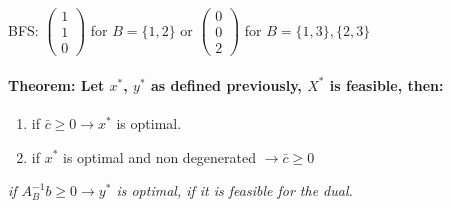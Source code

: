 \documentclass[main]{subfiles}
\begin{document}
BFS:
$\begin{pmatrix}
1\\
1\\
0
\end{pmatrix}$ for $B = \{1, 2\}$ or
$\begin{pmatrix}
0\\
0\\
2
\end{pmatrix}$ for $B = \{1,3\}, \{2, 3\}$

\paragraph{Theorem: Let $x^*$, $y^*$ as defined previously, $X^*$ is feasible,
then:}
\begin{enumerate}
\item if $\bar{c} \geq 0 \rightarrow x^*$ is optimal.
\item if $x^*$ is optimal and non degenerated $\rightarrow \bar{c} \geq 0$
\end{enumerate}

\emph{if $A^{-1}_B b \geq 0 \rightarrow y^*$ is optimal, if it is feasible for
the dual.}
\end{document}
